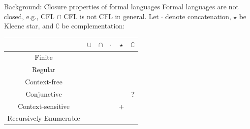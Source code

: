 \documentclass{beamer}
\newcommand{\cmark}{\ding{51}}%
\newcommand{\xmark}{\ding{55}}%
\begin{document}
    \begin{frame}[fragile]{Background: Closure properties of formal languages}
        Formal languages are not closed, e.g., CFL $\cap$ CFL is not CFL in general. Let $\cdot$ denote concatenation, $\star$ be Kleene star, and $\complement$ be complementation:\\
        \begin{table}
            \begin{tabular}{c|ccccc}
                & $\cup$ & $\cap$ & $\cdot$ & $\star$ & $\complement$ \\
                \hline
                Finite & \cmark & \cmark & \cmark & \cmark & \cmark \\
                Regular & \cmark & \cmark & \cmark & \cmark & \cmark \\
                Context-free & \cmark & \xmark & \cmark & \cmark & \xmark \\
                Conjunctive & \cmark & \cmark & \cmark & \cmark & ? \\
                Context-sensitive & \cmark & \cmark & \cmark & + & \cmark \\
                Recursively Enumerable & \cmark & \cmark & \cmark & \cmark & \xmark \\
            \end{tabular}
        \end{table}
    \end{frame}
\end{document}

